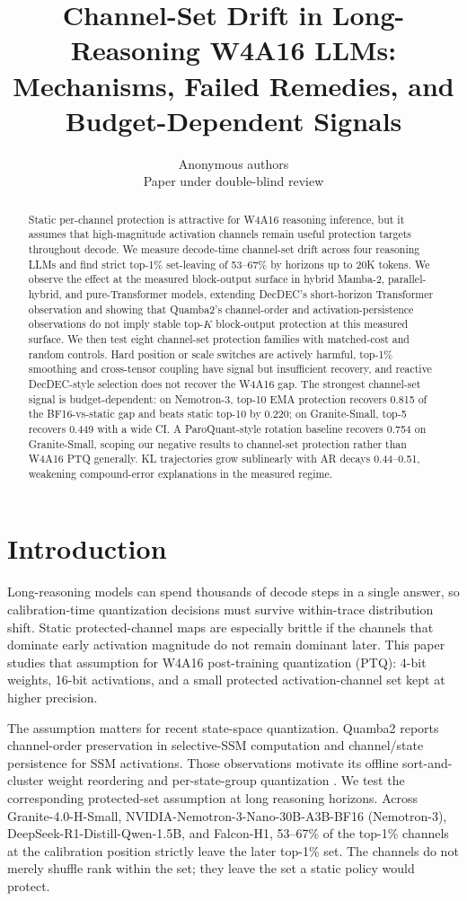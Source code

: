 \documentclass{article}
\title{Channel-Set Drift in Long-Reasoning W4A16 LLMs: Mechanisms, Failed Remedies, and Budget-Dependent Signals}
\author{Anonymous authors\\Paper under double-blind review}
\begin{document}
\maketitle

\begin{abstract}
Static per-channel protection is attractive for W4A16 reasoning inference, but it assumes that high-magnitude activation channels remain useful protection targets throughout decode. We measure decode-time channel-set drift across four reasoning LLMs and find strict top-1\% set-leaving of 53--67\% by horizons up to 20K tokens. We observe the effect at the measured block-output surface in hybrid Mamba-2, parallel-hybrid, and pure-Transformer models, extending DecDEC's short-horizon Transformer observation and showing that Quamba2's channel-order and activation-persistence observations do not imply stable top-$K$ block-output protection at this measured surface. We then test eight channel-set protection families with matched-cost and random controls. Hard position or scale switches are actively harmful, top-1\% smoothing and cross-tensor coupling have signal but insufficient recovery, and reactive DecDEC-style selection does not recover the W4A16 gap. The strongest channel-set signal is budget-dependent: on Nemotron-3, top-10 EMA protection recovers 0.815 of the BF16-vs-static gap and beats static top-10 by 0.220; on Granite-Small, top-5 recovers 0.449 with a wide CI. A ParoQuant-style rotation baseline recovers 0.754 on Granite-Small, scoping our negative results to channel-set protection rather than W4A16 PTQ generally. KL trajectories grow sublinearly with AR decays 0.44--0.51, weakening compound-error explanations in the measured regime.
\end{abstract}

\section{Introduction}

Long-reasoning models can spend thousands of decode steps in a single answer, so calibration-time quantization decisions must survive within-trace distribution shift. Static protected-channel maps are especially brittle if the channels that dominate early activation magnitude do not remain dominant later. This paper studies that assumption for W4A16 post-training quantization (PTQ): 4-bit weights, 16-bit activations, and a small protected activation-channel set kept at higher precision.

The assumption matters for recent state-space quantization. Quamba2 reports channel-order preservation in selective-SSM computation and channel/state persistence for SSM activations. Those observations motivate its offline sort-and-cluster weight reordering and per-state-group quantization \citep{chiang2025quamba2}. We test the corresponding protected-set assumption at long reasoning horizons. Across Granite-4.0-H-Small, NVIDIA-Nemotron-3-Nano-30B-A3B-BF16 (Nemotron-3), DeepSeek-R1-Distill-Qwen-1.5B, and Falcon-H1, 53--67\% of the top-1\% channels at the calibration position strictly leave the later top-1\% set. The channels do not merely shuffle rank within the set; they leave the set a static policy would protect.
\end{document}
